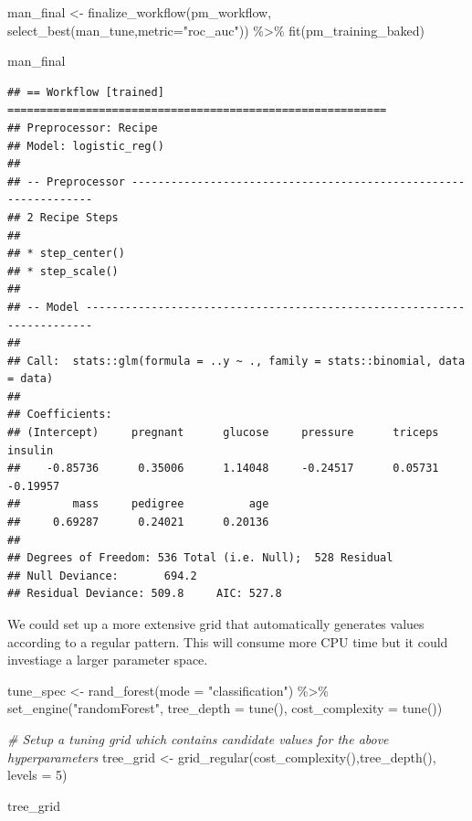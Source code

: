 \documentclass[
]{article}
\newenvironment{Shaded}{\begin{snugshade}}{\end{snugshade}}
\newcommand{\AttributeTok}[1]{\textcolor[rgb]{0.77,0.63,0.00}{#1}}
\newcommand{\CommentTok}[1]{\textcolor[rgb]{0.56,0.35,0.01}{\textit{#1}}}
\newcommand{\DecValTok}[1]{\textcolor[rgb]{0.00,0.00,0.81}{#1}}
\newcommand{\FunctionTok}[1]{\textcolor[rgb]{0.00,0.00,0.00}{#1}}
\newcommand{\NormalTok}[1]{#1}
\newcommand{\OtherTok}[1]{\textcolor[rgb]{0.56,0.35,0.01}{#1}}
\newcommand{\SpecialCharTok}[1]{\textcolor[rgb]{0.00,0.00,0.00}{#1}}
\newcommand{\StringTok}[1]{\textcolor[rgb]{0.31,0.60,0.02}{#1}}
\begin{document}
\begin{Shaded}
\begin{Highlighting}[]
\NormalTok{man\_final }\OtherTok{\textless{}{-}} \FunctionTok{finalize\_workflow}\NormalTok{(pm\_workflow,}
                               \FunctionTok{select\_best}\NormalTok{(man\_tune,}\AttributeTok{metric=}\StringTok{"roc\_auc"}\NormalTok{)) }\SpecialCharTok{\%\textgreater{}\%} 
             \FunctionTok{fit}\NormalTok{(pm\_training\_baked)}

\NormalTok{man\_final}
\end{Highlighting}
\end{Shaded}

\begin{verbatim}
## == Workflow [trained] ==========================================================
## Preprocessor: Recipe
## Model: logistic_reg()
## 
## -- Preprocessor ----------------------------------------------------------------
## 2 Recipe Steps
## 
## * step_center()
## * step_scale()
## 
## -- Model -----------------------------------------------------------------------
## 
## Call:  stats::glm(formula = ..y ~ ., family = stats::binomial, data = data)
## 
## Coefficients:
## (Intercept)     pregnant      glucose     pressure      triceps      insulin  
##    -0.85736      0.35006      1.14048     -0.24517      0.05731     -0.19957  
##        mass     pedigree          age  
##     0.69287      0.24021      0.20136  
## 
## Degrees of Freedom: 536 Total (i.e. Null);  528 Residual
## Null Deviance:       694.2 
## Residual Deviance: 509.8     AIC: 527.8
\end{verbatim}

We could set up a more extensive grid that automatically generates
values according to a regular pattern. This will consume more CPU time
but it could investiage a larger parameter space.

\begin{Shaded}
\begin{Highlighting}[]
\NormalTok{tune\_spec }\OtherTok{\textless{}{-}} 
  \FunctionTok{rand\_forest}\NormalTok{(}\AttributeTok{mode =} \StringTok{"classification"}\NormalTok{) }\SpecialCharTok{\%\textgreater{}\%}
  \FunctionTok{set\_engine}\NormalTok{(}\StringTok{"randomForest"}\NormalTok{, }\AttributeTok{tree\_depth =} \FunctionTok{tune}\NormalTok{(), }\AttributeTok{cost\_complexity =} \FunctionTok{tune}\NormalTok{())}

\CommentTok{\# Setup a tuning grid which contains candidate values for the above hyperparameters}
\NormalTok{tree\_grid }\OtherTok{\textless{}{-}} \FunctionTok{grid\_regular}\NormalTok{(}\FunctionTok{cost\_complexity}\NormalTok{(),}\FunctionTok{tree\_depth}\NormalTok{(),}
                          \AttributeTok{levels =} \DecValTok{5}\NormalTok{)}

\NormalTok{tree\_grid}
\end{Highlighting}
\end{Shaded}
\end{document}
